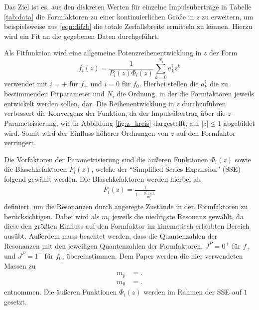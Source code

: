 Das Ziel ist es, aus den diskreten Werten für einzelne Impulsüberträge in Tabelle \ref{tab:data} die Formfaktoren zu einer kontinuierlichen Größe in $z$ zu erweitern, um beispielsweise aus \eqref{eqn:difzb} die totale Zerfallsbreite ermitteln zu können.
Hierzu wird ein Fit an die gegebenen Daten durchgeführt.

Als Fitfunktion wird eine allgemeine Potenzreihenentwicklung in $z$ der Form
\begin{equation}
  \label{eqn:reihenentwicklung}
  f_i(z) = \frac{1}{P_i(z) \Phi_i(z)} \sum_{k=0}^{N_i} a_{k}^{i} z^{k}
\end{equation}
verwendet mit $i=+$ für $f_+$ und $i=0$ für $f_0$.
Hierbei stellen die $a_{k}^{i}$ die zu bestimmenden Fitparameter und $N_i$ die Ordnung, in der die Formfaktoren jeweils entwickelt werden sollen, dar.
Die Reihenentwicklung in $z$ durchzuführen verbessert die Konvergenz der Funktion, da der Impulsübertrag über die $z$-Parametrisierung, wie in Abbildung \ref{fig:z_kreis} dargestellt, auf $\lvert z \rvert \leq 1$ abgebildet wird.
Somit wird der Einfluss höherer Ordnungen von $z$ auf den Formfaktor verringert. 

Die Vorfaktoren der Parametrisierung sind die äußeren Funktionen  $\Phi_i(z)$ sowie die Blaschkefaktoren $P_i(z)$, welche der \enquote{Simplified Series Expansion} (SSE) \cite{PhysRevD.79.013008} folgend gewählt werden.
Die Blaschkefaktoren werden hierbei als
\begin{align*}
  P_i(z) = \frac{1}{1 - \frac{q^2(z)}{m_i^2}}
\end{align*}
definiert, um die Resonanzen durch angeregte Zustände in den Formfaktoren zu berücksichtigen. 
Dabei wird als $m_i$ jeweils die niedrigste Resonanz gewählt, da diese den größten Einfluss auf den Formfaktor im kinematisch erlaubten Bereich ausübt.
Außerdem muss beachtet werden, dass die Quantenzahlen der Resonanzen mit den jeweiligen Quantenzahlen der Formfaktoren, $J^P = 0^{+}$ für $f_+$ und $J^P = 1^-$ für $f_0$, übereinstimmen.
Dem Paper \cite{PhysRevD.94.094008} werden die hier verwendeten Massen zu
\begin{align*}
  m_p &= .\\
  m_0 & = .
\end{align*}
entnommen.
Die äußeren Funktionen $\Phi_i(z)$ werden im Rahmen der SSE auf $\num{1}$ gesetzt.

